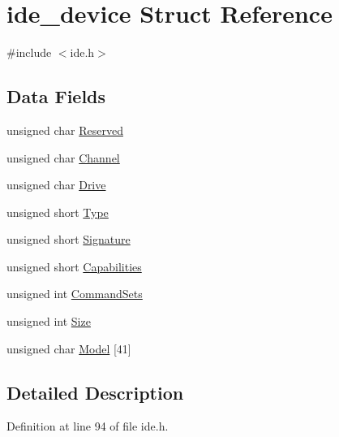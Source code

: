 \hypertarget{structide__device}{}\section{ide\+\_\+device Struct Reference}
\label{structide__device}


{\ttfamily \#include $<$ide.\+h$>$}

\subsection*{Data Fields}
\begin{DoxyCompactItemize}
\item 
unsigned char \hyperlink{structide__device_a293fdfa780f639d9eb98fcf664699b08_a293fdfa780f639d9eb98fcf664699b08}{Reserved}
\item 
unsigned char \hyperlink{structide__device_aea5a88e5bb25bdf109e66a51cba51699_aea5a88e5bb25bdf109e66a51cba51699}{Channel}
\item 
unsigned char \hyperlink{structide__device_a8b7ef57ccb98cb9511bd285f1bf057f5_a8b7ef57ccb98cb9511bd285f1bf057f5}{Drive}
\item 
unsigned short \hyperlink{structide__device_a3a1fc6eda2f5cafc41f8626c67ec9631_a3a1fc6eda2f5cafc41f8626c67ec9631}{Type}
\item 
unsigned short \hyperlink{structide__device_ad31d088a8fd56a5760a2bcff6891f21d_ad31d088a8fd56a5760a2bcff6891f21d}{Signature}
\item 
unsigned short \hyperlink{structide__device_af318d471b2f7093cd2ba95e9711b617c_af318d471b2f7093cd2ba95e9711b617c}{Capabilities}
\item 
unsigned int \hyperlink{structide__device_ad090e2f34b0618e837e048593f480683_ad090e2f34b0618e837e048593f480683}{Command\+Sets}
\item 
unsigned int \hyperlink{structide__device_a37f4be958e0c710ab62e2536497f392d_a37f4be958e0c710ab62e2536497f392d}{Size}
\item 
unsigned char \hyperlink{structide__device_a8528ca17136240ce55c9441d68711e78_a8528ca17136240ce55c9441d68711e78}{Model} \mbox{[}41\mbox{]}
\end{DoxyCompactItemize}


\subsection{Detailed Description}


Definition at line 94 of file ide.\+h.




